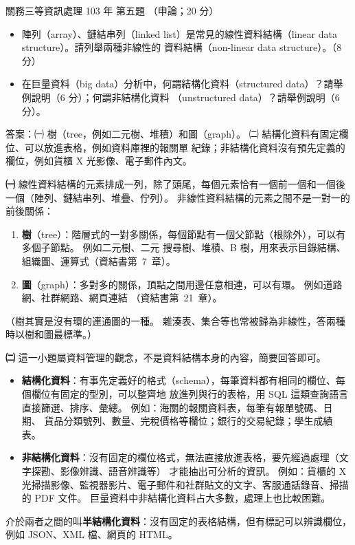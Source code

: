 \begin{pastexam}[label={px:gw3-103-ds-05}]{關務三等資訊處理 103 年 第五題}
（申論；20 分）

\begin{itemize}[leftmargin=2.2em]
\item[㈠] 陣列（array）、鏈結串列（linked list）是常見的線性資料結構（linear data structure）。請列舉兩種非線性的
資料結構（non-linear data structure）。（8 分）
\item[㈡] 在巨量資料（big data）分析中，何謂結構化資料（structured data）？請舉例說明（6 分）；何謂非結構化資料
（unstructured data）？請舉例說明（6 分）。
\end{itemize}
\end{pastexam}

\begin{pastsoln}
答案：㈠ 樹（tree，例如二元樹、堆積）和圖（graph）。 ㈡ 結構化資料有固定欄位、可以放進表格，例如資料庫裡的報關單
紀錄；非結構化資料沒有預先定義的欄位，例如貨櫃 X 光影像、電子郵件內文。

\textbf{㈠} 線性資料結構的元素排成一列，除了頭尾，每個元素恰有一個前一個和一個後一個（陣列、鏈結串列、堆疊、佇列）。
非線性資料結構的元素之間不是一對一的前後關係：
\begin{enumerate}
\item \textbf{樹}（tree）：階層式的一對多關係，每個節點有一個父節點（根除外），可以有多個子節點。 例如二元樹、二元
搜尋樹、堆積、B 樹，用來表示目錄結構、組織圖、運算式（資結書第~7~章）。
\item \textbf{圖}（graph）：多對多的關係，頂點之間用邊任意相連，可以有環。 例如道路網、社群網路、網頁連結
（資結書第~21~章）。
\end{enumerate}
（樹其實是沒有環的連通圖的一種。 雜湊表、集合等也常被歸為非線性，答兩種時以樹和圖最標準。）

\textbf{㈡} 這一小題屬資料管理的觀念，不是資料結構本身的內容，簡要回答即可。
\begin{itemize}
\item \textbf{結構化資料}：有事先定義好的格式（schema），每筆資料都有相同的欄位、每個欄位有固定的型別，可以整齊地
放進列與行的表格，用 SQL 這類查詢語言直接篩選、排序、彙總。 例如：海關的報關資料表，每筆有報單號碼、日期、
貨品分類號列、數量、完稅價格等欄位；銀行的交易紀錄；學生成績表。
\item \textbf{非結構化資料}：沒有固定的欄位格式，無法直接放進表格，要先經過處理（文字探勘、影像辨識、語音辨識等）
才能抽出可分析的資訊。 例如：貨櫃的 X 光掃描影像、監視器影片、電子郵件和社群貼文的文字、客服通話錄音、掃描的
PDF 文件。 巨量資料中非結構化資料占大多數，處理上也比較困難。
\end{itemize}
介於兩者之間的叫\textbf{半結構化資料}：沒有固定的表格結構，但有標記可以辨識欄位，例如 JSON、XML 檔、網頁的 HTML。
\end{pastsoln}
